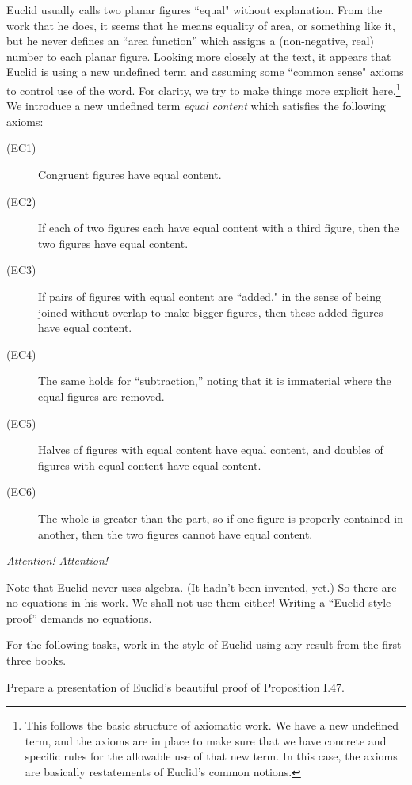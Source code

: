 Euclid usually calls two planar figures ``equal" without explanation. 
From the work that he does, it seems that he means equality of area, or something like it, but he never defines an ``area function'' which assigns a (non-negative, real) number to each planar figure. 
Looking more closely at the text, it appears that Euclid is using a new undefined term and assuming some ``common sense" axioms to control use of the word. 
For clarity, we try to make things more explicit here.\footnote{This follows the basic structure of axiomatic work. We have a new undefined term, and the axioms are in place to make sure that we have concrete and specific rules for the allowable use of that new term. In this case, the axioms are basically restatements of Euclid's common notions.}
We introduce a new undefined term \emph{equal content} which satisfies the following axioms:
\begin{description}
\item[(EC1)] Congruent figures have equal content.
\item[(EC2)] If each of two figures each have equal content with a third figure, then the two figures have equal content.
\item[(EC3)] If pairs of figures with equal content are ``added," in the sense of being joined without overlap to make bigger figures, then these added figures have equal content.
\item[(EC4)] The same holds for ``subtraction,'' noting that it is immaterial where the equal figures are removed.
\item[(EC5)] Halves of figures with equal content have equal content, and doubles of figures with equal content have equal content.
\item[(EC6)] The whole is greater than the part, so if one figure is properly contained in another, then the two figures cannot have equal content.
\end{description}

\begin{center}\textit{Attention! Attention!}\end{center}

Note that Euclid never uses algebra. (It hadn't been invented, yet.) So there are no equations in his work. We shall not use them either! Writing a ``Euclid-style proof'' demands no equations.


For the following tasks, work in the style of Euclid using any result from the first three books.

\begin{problem}\label{prob:present-pythagoras} 
Prepare a presentation of Euclid's beautiful proof of Proposition I.47.
\end{problem}

